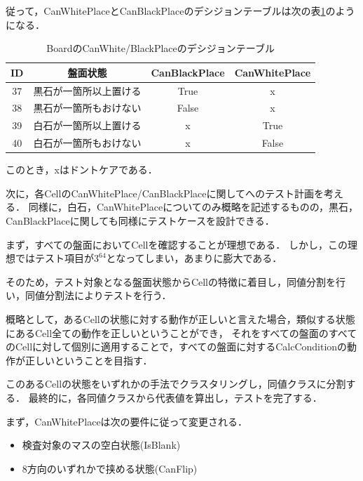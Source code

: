 \documentclass[platex,dvipdfmx,12pt]{jsarticle}
\begin{document}
従って，CanWhitePlaceとCanBlackPlaceのデシジョンテーブルは次の表\ref{tab:enshu5-board-decision-board}のようになる．

\begin{table}[H]
  \centering
  \caption{BoardのCanWhite/BlackPlaceのデシジョンテーブル}
  \label{tab:enshu5-board-decision-board}
  \begin{tabular}{cccc}
    ID & 盤面状態 & CanBlackPlace & CanWhitePlace \\ 
    \hline
    37 & 黒石が一箇所以上置ける & True & x \\
    38 & 黒石が一箇所もおけない & False & x \\
    39 & 白石が一箇所以上置ける & x & True \\
    40 & 白石が一箇所もおけない & x & False \\
  \end{tabular}
\end{table}

このとき，xはドントケアである．



次に，各CellのCanWhitePlace/CanBlackPlaceに関してへのテスト計画を考える．
同様に，白石，CanWhitePlaceについてのみ概略を記述するものの，黒石，CanBlackPlaceに関しても同様にテストケースを設計できる．

まず，すべての盤面においてCellを確認することが理想である．
しかし，この理想ではテスト項目が$3^{64}$となってしまい，あまりに膨大である．

そのため，テスト対象となる盤面状態からCellの特徴に着目し，同値分割を行い，同値分割法によりテストを行う．

概略として，あるCellの状態に対する動作が正しいと言えた場合，類似する状態にあるCell全ての動作を正しいということができ，
それをすべての盤面のすべてのCellに対して個別に適用することで，すべての盤面に対するCalcConditionの動作が正しいということを目指す．

このあるCellの状態をいずれかの手法でクラスタリングし，同値クラスに分割する．
最終的に，各同値クラスから代表値を算出し，テストを完了する．

まず，CanWhitePlaceは次の要件に従って変更される．

\begin{itemize}
  \item 検査対象のマスの空白状態(IsBlank)
  \item 8方向のいずれかで挟める状態(CanFlip)
\end{itemize}
\end{document}
